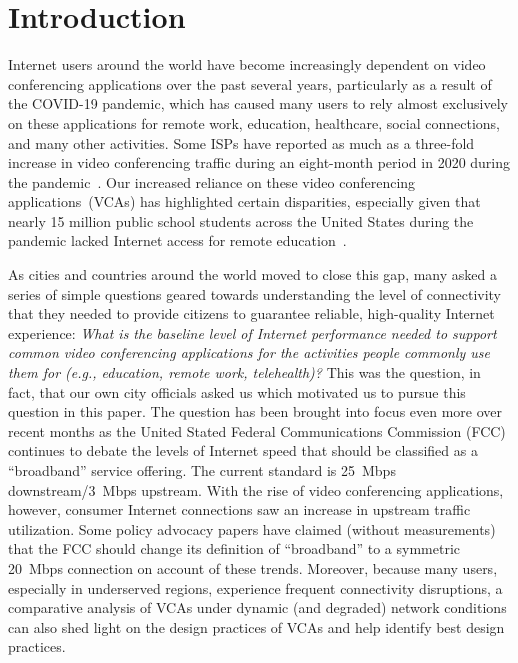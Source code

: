 \section{Introduction}\label{sec:intro}

Internet users around the world have become increasingly dependent on video
conferencing applications over the past several years, particularly as a
result of the COVID-19 pandemic, which has caused many users to rely almost
exclusively on these applications for remote work, education, healthcare,
social connections, and many other activities.  Some ISPs have reported as
much as a three-fold increase in video conferencing traffic during an
eight-month period in 2020 during the pandemic~\cite{bitag_report}. Our
increased reliance on these video conferencing applications~(VCAs) has highlighted
certain disparities, especially given that nearly 15 million
public school students across the United States during the pandemic lacked
Internet access for remote education~\cite{common_sense_report}. 

As cities and countries around the world moved to close this gap, many asked a
series of simple questions geared towards understanding the level of
connectivity that they needed to provide citizens to guarantee reliable,
high-quality Internet experience: {\em What is the baseline level of Internet
performance needed to support common video conferencing applications for the
activities people commonly use them for (e.g., education, remote work,
telehealth)?} This was the question, in fact, that our own city officials
asked us which motivated us to pursue this question in this paper. The question
has been brought into focus even more over recent months as the United Stated
Federal Communications Commission (FCC) continues to debate the levels of
Internet speed that should be classified as a ``broadband'' service offering. The
current standard is 25~Mbps downstream/3~Mbps upstream. With the rise of video
conferencing applications, however, consumer Internet connections saw an
increase in upstream traffic utilization. Some policy advocacy papers have
claimed (without measurements) that the FCC should change its definition
of ``broadband'' to a symmetric 20~Mbps connection on account of these trends.
Moreover, because many users, especially in underserved regions, experience
frequent connectivity disruptions, a comparative analysis of VCAs under
dynamic (and degraded) network conditions can also shed light on the design
practices of VCAs and help identify best design practices.

